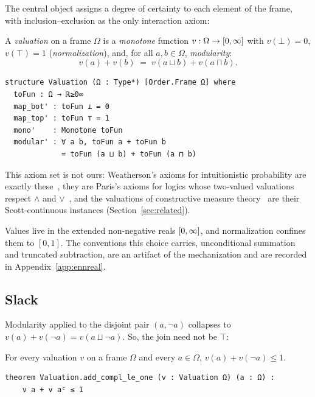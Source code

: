 The central object assigns a degree of certainty to each element of
the frame, with inclusion--exclusion as the only interaction axiom:

\begin{definition}
\label{def:valuation}
A \emph{valuation} on a frame $\Omega$ is a \emph{monotone} function
$v : \Omega \to [0,\infty]$ with
$v(\bot) = 0$, $v(\top) = 1$ (\emph{normalization}), and, for all
$a, b \in \Omega$, \emph{modularity}:
\[
  v(a) + v(b) \;=\; v(a \sqcup b) + v(a \sqcap b).
\]
\end{definition}

\begin{lstlisting}
structure Valuation (Ω : Type*) [Order.Frame Ω] where
  toFun : Ω → ℝ≥0∞
  map_bot' : toFun ⊥ = 0
  map_top' : toFun ⊤ = 1
  mono'    : Monotone toFun
  modular' : ∀ a b, toFun a + toFun b
             = toFun (a ⊔ b) + toFun (a ⊓ b)
\end{lstlisting}

This axiom set is not ours: Weatherson's axioms for intuitionistic
probability are exactly these~\cite{weatherson2003}, they are Paris's
axioms for logics whose two-valued valuations respect $\wedge$ and
$\vee$~\cite{paris2001}, and the
valuations of constructive measure
theory~\cite{vickers2008,coquand-spitters2009} are their
Scott-continuous instances (Section~\ref{sec:related}).

Values live in the extended non-negative reals $[0,\infty]$, and
normalization confines them to $[0,1]$.  The
conventions this choice carries, unconditional summation and truncated
subtraction, are an artifact of the mechanization and are recorded in
Appendix~\ref{app:ennreal}.

\subsection{Slack}

Modularity applied to the disjoint pair $(a, \neg a)$
collapses to
$v(a) + v(\neg a) = v(a \sqcup \neg a)$.
So, the join need not be $\top$:

\begin{theorem}
\label{thm:add-compl-le-one}
For every valuation $v$ on a frame $\Omega$ and every $a \in \Omega$,
$v(a) + v(\neg a) \le 1$.
\end{theorem}

\begin{lstlisting}
theorem Valuation.add_compl_le_one (v : Valuation Ω) (a : Ω) :
    v a + v aᶜ ≤ 1
\end{lstlisting}

